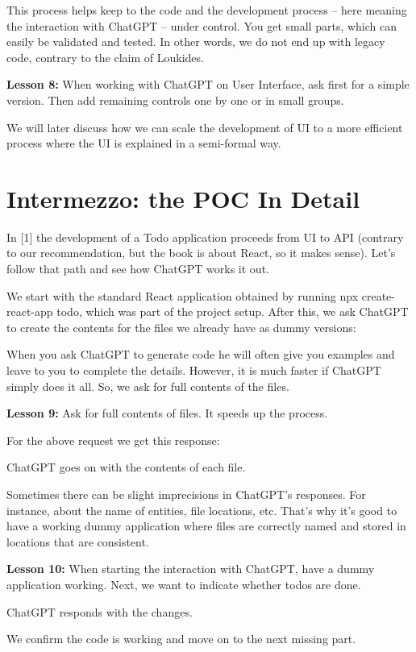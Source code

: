 \documentclass[runningheads]{llncs}
\begin{document}
This process helps keep to the code and the development process – here meaning the interaction with ChatGPT – under control. You get small parts, which can easily be validated and tested. In other words, we do not end up with legacy code, contrary to the claim of Loukides\cite{Loukides2023}.

\textbf{Lesson 8:} When working with ChatGPT on User Interface, ask first for a simple version. Then add remaining controls one by one or in small groups.

We will later discuss how we can scale the development of UI to a more efficient process where the UI is explained in a semi-formal way.

\section{Intermezzo: the POC In Detail}
In [1] the development of a Todo application proceeds from UI to API (contrary to our recommendation, but the book is about React, so it makes sense). Let's follow that path and see how ChatGPT works it out.

We start with the standard React application obtained by running npx create-react-app todo, which was part of the project setup. After this, we ask ChatGPT to create the contents for the files we already have as dummy versions:

When you ask ChatGPT to generate code he will often give you examples and leave to you to complete the details. However, it is much faster if ChatGPT simply does it all. So, we ask for full contents of the files.

\textbf{Lesson 9:} Ask for full contents of files. It speeds up the process.

For the above request we get this response:

ChatGPT goes on with the contents of each file.
   
Sometimes there can be slight imprecisions in ChatGPT's responses. For instance, about the name of entities, file locations, etc. That's why it's good to have a working dummy application where files are correctly named and stored in locations that are consistent.

\textbf{Lesson 10:} When starting the interaction with ChatGPT, have a dummy application working.
Next, we want to indicate whether todos are done.

ChatGPT responds with the changes.
    
We confirm the code is working and move on to the next missing part.
\end{document}
